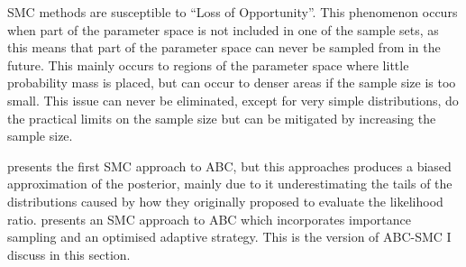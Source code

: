 \documentclass[11pt,a4paper]{article}
\theoremstyle{break}
\begin{document}
  \par SMC methods are susceptible to ``Loss of Opportunity''. This phenomenon occurs when part of the parameter space is not included in one of the sample sets, as this means that part of the parameter space can never be sampled from in the future. This mainly occurs to regions of the parameter space where little probability mass is placed, but can occur to denser areas if the sample size is too small. This issue can never be eliminated, except for very simple distributions, do the practical limits on the sample size but can be mitigated by increasing the sample size.

  \par \cite[]{SMC_wo_likelihood} presents the first SMC approach to ABC, but this approaches produces a biased approximation of the posterior, mainly due to it underestimating the tails of the distributions caused by how they originally proposed to evaluate the likelihood ratio. \cite[]{adaptive_ABC} presents an SMC approach to ABC which incorporates importance sampling and an optimised adaptive strategy. This is the version of ABC-SMC I discuss in this section.
\end{document}
